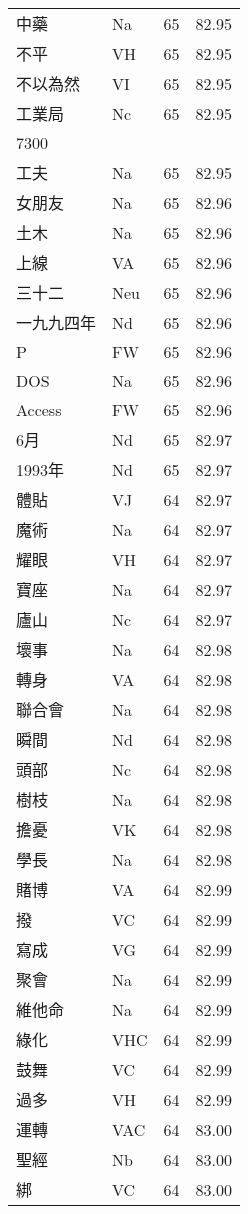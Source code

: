 \documentclass[twocolumn]{book}
\begin{document}
\begin{supertabular}{llrr}
中藥 & Na & 65 &  82.95\\
不平 & VH & 65 &  82.95\\
不以為然 & VI & 65 &  82.95\\
工業局 & Nc & 65 &  82.95\\
7300\\
工夫 & Na & 65 &  82.95\\
女朋友 & Na & 65 &  82.96\\
土木 & Na & 65 &  82.96\\
上線 & VA & 65 &  82.96\\
三十二 & Neu & 65 &  82.96\\
一九九四年 & Nd & 65 &  82.96\\
P & FW & 65 &  82.96\\
DOS & Na & 65 &  82.96\\
Access & FW & 65 &  82.96\\
6月 & Nd & 65 &  82.97\\
1993年 & Nd & 65 &  82.97\\
體貼 & VJ & 64 &  82.97\\
魔術 & Na & 64 &  82.97\\
耀眼 & VH & 64 &  82.97\\
寶座 & Na & 64 &  82.97\\
廬山 & Nc & 64 &  82.97\\
壞事 & Na & 64 &  82.98\\
轉身 & VA & 64 &  82.98\\
聯合會 & Na & 64 &  82.98\\
瞬間 & Nd & 64 &  82.98\\
頭部 & Nc & 64 &  82.98\\
樹枝 & Na & 64 &  82.98\\
擔憂 & VK & 64 &  82.98\\
學長 & Na & 64 &  82.98\\
賭博 & VA & 64 &  82.99\\
撥 & VC & 64 &  82.99\\
寫成 & VG & 64 &  82.99\\
聚會 & Na & 64 &  82.99\\
維他命 & Na & 64 &  82.99\\
綠化 & VHC & 64 &  82.99\\
鼓舞 & VC & 64 &  82.99\\
過多 & VH & 64 &  82.99\\
運轉 & VAC & 64 &  83.00\\
聖經 & Nb & 64 &  83.00\\
綁 & VC & 64 &  83.00\\

\end{supertabular}
\end{document}

